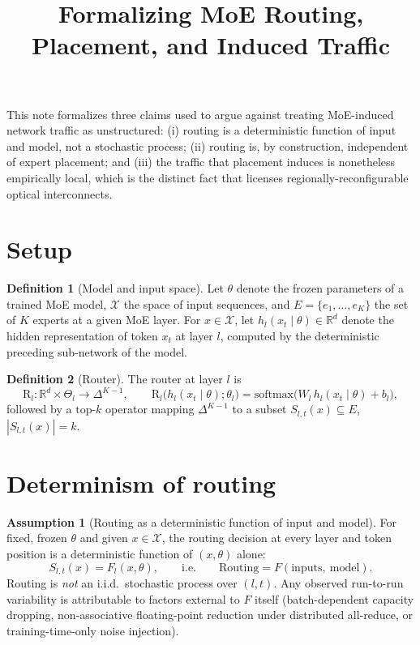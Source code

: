 \documentclass[11pt]{article}
\title{Formalizing MoE Routing, Placement, and Induced Traffic}
\author{}
\date{}
\theoremstyle{definition}
\newtheorem{definition}{Definition}
\newtheorem{assumption}{Assumption}
\newcommand{\Route}{\mathrm{R}}
\begin{document}
\maketitle

This note formalizes three claims used to argue against treating MoE-induced
network traffic as unstructured: (i) routing is a deterministic function of
input and model, not a stochastic process; (ii) routing is, by construction,
independent of expert placement; and (iii) the traffic that placement induces
is nonetheless empirically local, which is the distinct fact that licenses
regionally-reconfigurable optical interconnects.

\section{Setup}

\begin{definition}[Model and input space]
Let $\theta$ denote the frozen parameters of a trained MoE model, $\mathcal{X}$
the space of input sequences, and $E=\{e_1,\dots,e_K\}$ the set of $K$ experts
at a given MoE layer. For $x\in\mathcal{X}$, let $h_l(x_t\mid\theta)\in\mathbb{R}^d$
denote the hidden representation of token $x_t$ at layer $l$, computed by the
deterministic preceding sub-network of the model.
\end{definition}

\begin{definition}[Router]
The router at layer $l$ is
\[
  \Route_l:\mathbb{R}^d\times\Theta_l\longrightarrow\Delta^{K-1},\qquad
  \Route_l\bigl(h_l(x_t\mid\theta);\theta_l\bigr)=\mathrm{softmax}\bigl(W_l\,h_l(x_t\mid\theta)+b_l\bigr),
\]
followed by a $\mathrm{top}\text{-}k$ operator mapping $\Delta^{K-1}$ to a subset
$S_{l,t}(x)\subseteq E$, $|S_{l,t}(x)|=k$.
\end{definition}

\section{Determinism of routing}

\begin{assumption}[Routing as a deterministic function of input and model]
\label{ass:determinism}
For fixed, frozen $\theta$ and given $x\in\mathcal{X}$, the routing decision at
every layer and token position is a deterministic function of $(x,\theta)$ alone:
\[
  S_{l,t}(x) = F_l(x,\theta), \qquad\text{i.e.}\qquad
  \mathrm{Routing} = F(\mathrm{inputs},\ \mathrm{model}).
\]
Routing is \emph{not} an i.i.d.\ stochastic process over $(l,t)$. Any observed
run-to-run variability is attributable to factors external to $F$ itself
(batch-dependent capacity dropping, non-associative floating-point reduction
under distributed all-reduce, or training-time-only noise injection).
\end{assumption}
\end{document}
